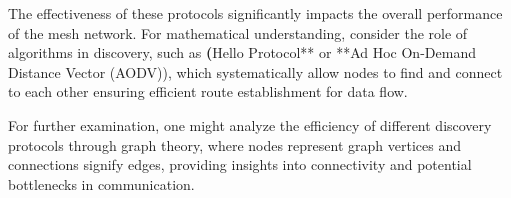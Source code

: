 The effectiveness of these protocols significantly impacts the overall performance of the mesh network. For mathematical understanding, consider the role of algorithms in discovery, such as \textbf(Hello Protocol** or **Ad Hoc On-Demand Distance Vector (AODV)), which systematically allow nodes to find and connect to each other ensuring efficient route establishment for data flow.

For further examination, one might analyze the efficiency of different discovery protocols through graph theory, where nodes represent graph vertices and connections signify edges, providing insights into connectivity and potential bottlenecks in communication.

